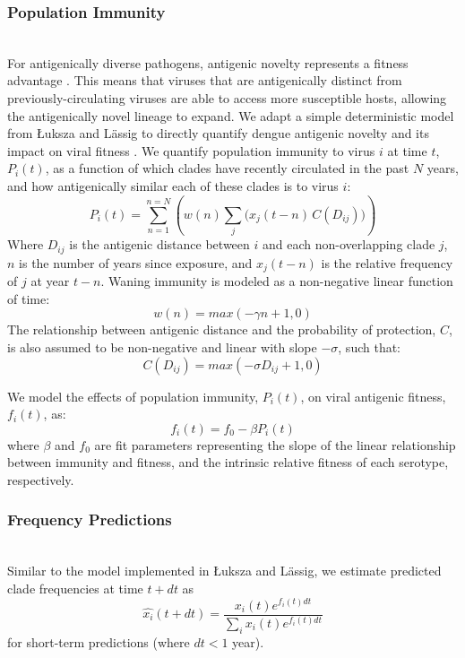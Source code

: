 \documentclass[11pt,oneside,letterpaper]{article}
\begin{document}
\subsubsection{Population Immunity}\\
For antigenically diverse pathogens, antigenic novelty represents a fitness advantage \citep{lipsitch2007patterns}.
This means that viruses that are antigenically distinct from previously-circulating viruses are able to access more susceptible hosts, allowing the antigenically novel lineage to expand.
We adapt a simple deterministic model from {\L}uksza and L\"assig to directly quantify dengue antigenic novelty and its impact on viral fitness \citep{luksza2014predictive}.
We quantify population immunity to virus $i$ at time $t$, $P_i(t)$, as a function of which clades have recently circulated in the past $N$ years, and how antigenically similar each of these clades is to virus $i$:
\begin{equation}
  \label{eq_population_immunity}
P_i(t) = \sum_{n=1}^{n=N} \left(w(n)  \sum_{j} \Big( x_j(t-n) \, C( D_{ij}) \Big) \right)
\end{equation}
Where $D_{ij}$ is the antigenic distance between $i$ and each non-overlapping clade $j$, $n$ is the number of years since exposure, and $x_j(t-n)$ is the relative frequency of $j$ at year $t-n$.
Waning immunity is modeled as a non-negative linear function of time:
\begin{equation}
\label{eq_waning_immunity}
  w(n) = max(-\gamma n + 1, 0)
\end{equation}
The relationship between antigenic distance and the probability of protection, $C$, is also assumed to be non-negative and linear with slope $-\sigma$, such that:
\begin{equation}
C(D_{ij}) = max(-\sigma D_{ij} + 1, 0)
\end{equation}

We model the effects of population immunity, $P_i(t)$, on viral antigenic fitness, $f_i(t)$, as:
\begin{equation}
  \label{eq_fitness}
f_i(t) = f_0-\beta P_i(t)
\end{equation}
where $\beta$ and $f_0$ are fit parameters representing the slope of the linear relationship between immunity and fitness, and the intrinsic relative fitness of each serotype, respectively.

\subsubsection{Frequency Predictions}\\
Similar to the model implemented in {\L}uksza and L\"assig, we estimate predicted clade frequencies at time $t + dt$ as
\begin{equation}
  \label{eq_predict_frequency}
\hat{x_i}(t+dt) = \frac{x_i(t) e^{f_i(t) dt}}{\sum_{i}x_i(t) e^{f_i(t) dt}}
\end{equation}
for short-term predictions (where $dt < 1$ year).
\end{document}
